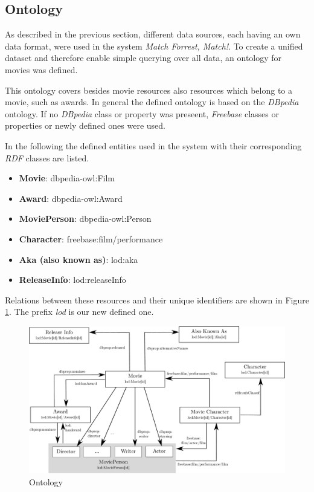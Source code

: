\subsection{Ontology}
\label{subsec_method_ontology}

As described in the previous section, different data sources, each having an own data format, were used in the system \emph{Match Forrest, Match!}.
To create a unified dataset and therefore enable simple querying over all data, an ontology for movies was defined.

This ontology covers besides movie resources also resources which belong to a movie, such as awards.
In general the defined ontology is based on the \textit{DBpedia} ontology.
If no \textit{DBpedia} class or property was preseent, \textit{Freebase} classes or properties or newly defined ones were used.

In the following the defined entities used in the system with their corresponding \textit{RDF} classes are listed.
\begin{itemize}
	\item \textbf{Movie}: dbpedia-owl:Film
	\item \textbf{Award}: dbpedia-owl:Award
	\item \textbf{MoviePerson}: dbpedia-owl:Person
	\item \textbf{Character}: freebase:film/performance
	\item \textbf{Aka (also known as)}: lod:aka
	\item \textbf{ReleaseInfo}: lod:releaseInfo
\end{itemize}
Relations between these resources and their unique identifiers are shown in Figure \ref{fig_ontology}.
The prefix \textit{lod} is our new defined one.

\begin{figure}[h!]
\includegraphics[width=\textwidth]{images/ontology.pdf}
\caption{Ontology}
\label{fig_ontology}
\end{figure}

